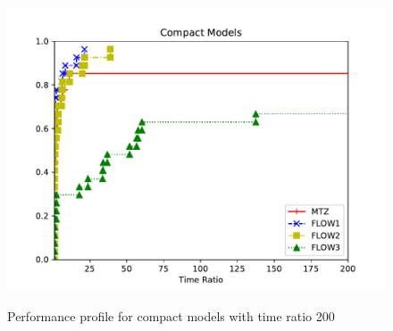 \begin{figure}[H]
\centering
	\includegraphics[scale=0.9]{media/compact200.pdf} \\
	\caption{Performance profile for compact models with time ratio 200}
	\label{fig:compacts200}
\end{figure}



